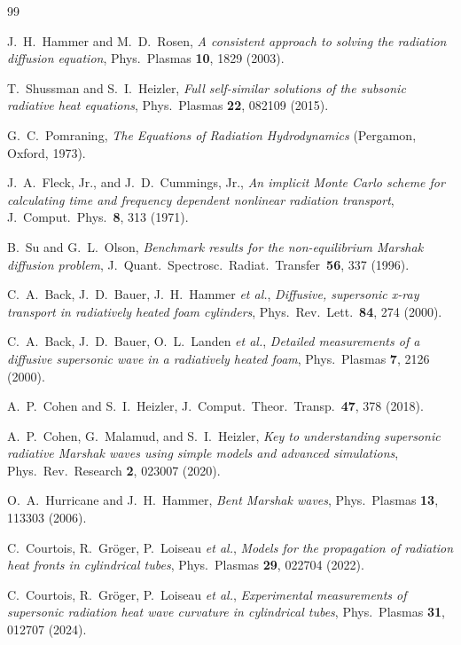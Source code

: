 \documentclass[11pt]{article}
\begin{document}
\begin{thebibliography}{99}

J.~H.~Hammer and M.~D.~Rosen,
\textit{A consistent approach to solving the radiation diffusion equation},
Phys.\ Plasmas \textbf{10}, 1829 (2003).

T.~Shussman and S.~I.~Heizler,
\textit{Full self-similar solutions of the subsonic radiative heat equations},
Phys.\ Plasmas \textbf{22}, 082109 (2015).

G.~C.~Pomraning,
\textit{The Equations of Radiation Hydrodynamics}
(Pergamon, Oxford, 1973).

J.~A.~Fleck, Jr., and J.~D.~Cummings, Jr.,
\textit{An implicit Monte Carlo scheme for calculating time and frequency dependent nonlinear radiation transport},
J.~Comput.~Phys.~\textbf{8}, 313 (1971).

B.~Su and G.~L.~Olson,
\textit{Benchmark results for the non-equilibrium Marshak diffusion problem},
J.~Quant.~Spectrosc.~Radiat.~Transfer~\textbf{56}, 337 (1996).

C.~A.~Back, J.~D.~Bauer, J.~H.~Hammer \textit{et al.},
\textit{Diffusive, supersonic x-ray transport in radiatively heated foam cylinders},
Phys.\ Rev.\ Lett.\ \textbf{84}, 274 (2000).

C.~A.~Back, J.~D.~Bauer, O.~L.~Landen \textit{et al.},
\textit{Detailed measurements of a diffusive supersonic wave in a radiatively heated foam},
Phys.\ Plasmas \textbf{7}, 2126 (2000).

A.~P.~Cohen and S.~I.~Heizler,
J.\ Comput.\ Theor.\ Transp.\ \textbf{47}, 378 (2018).

A.~P.~Cohen, G.~Malamud, and S.~I.~Heizler,
\textit{Key to understanding supersonic radiative Marshak waves using simple models and advanced simulations},
Phys.\ Rev.\ Research \textbf{2}, 023007 (2020).

O.~A.~Hurricane and J.~H.~Hammer,
\textit{Bent Marshak waves},
Phys.\ Plasmas \textbf{13}, 113303 (2006).

C.~Courtois, R.~Gr\"oger, P.~Loiseau \textit{et al.},
\textit{Models for the propagation of radiation heat fronts in cylindrical tubes},
Phys.\ Plasmas \textbf{29}, 022704 (2022).

C.~Courtois, R.~Gr\"oger, P.~Loiseau \textit{et al.},
\textit{Experimental measurements of supersonic radiation heat wave curvature in cylindrical tubes},
Phys.\ Plasmas \textbf{31}, 012707 (2024).

\end{thebibliography}
\end{document}
